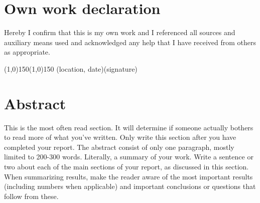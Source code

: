 \cleardoublepage
\insertblankpage
\section*{Own work declaration}
  Hereby I confirm that this is my own work and I referenced all sources and
  auxiliary means used and acknowledged any help that I have received from
  others as appropriate.

\vspace*{30mm}
\hspace{-6mm}\line(1,0){150}\hspace{44mm}\line(1,0){150}
\newline
(location, date)\hspace{72mm}(signature)

\cleardoublepage
%

\cleardoublepage
\insertblankpage
\section*{Abstract}
This is the most often read section. It will determine if someone actually bothers to read more
of what you've written. Only write this section after you have completed your
report. The abstract consist of only one paragraph, mostly limited
to 200-300 words. Literally, a summary of your work. Write a sentence
or two about each of the main sections of your report, as discussed in this section. When
summarizing results, make the reader aware of the most important results (including numbers when applicable)
and important conclusions or questions that follow from these.
\newline
\newpage

